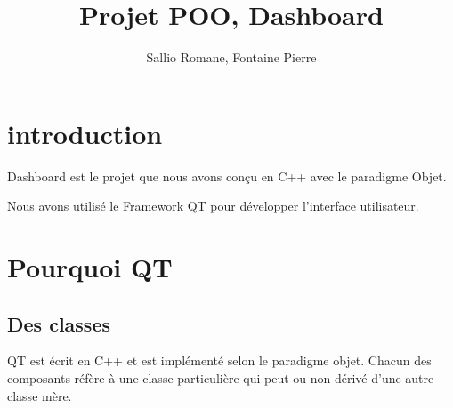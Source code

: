 \documentclass{beamer}
\title{Projet POO, Dashboard}
\author{Sallio Romane, Fontaine Pierre}
\institute{UPPA}
\begin{document}
  \begin{frame}
    \titlepage
  \end{frame}
  \begin{frame}
    \tableofcontents
  \end{frame}
  \section{introduction}
    \begin{frame}
      Dashboard est le projet que nous avons conçu en C++ avec le paradigme Objet.

      Nous avons utilisé le Framework QT pour développer l'interface utilisateur.
    \end{frame}
  \section{Pourquoi QT}
    \subsection{Des classes}
    \begin{frame}
      QT est écrit en C++ et est implémenté selon le paradigme objet. Chacun des composants réfère à une classe particulière qui peut ou non dérivé d'une autre classe mère.
    \end{frame}
\end{document}

